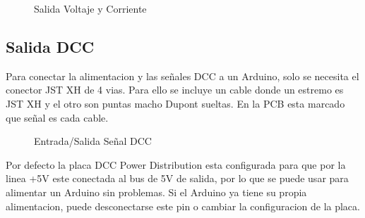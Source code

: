 \begin{figure}[h]
    \centering
    \caption{Salida Voltaje y Corriente}
    \label{fig:VccOutLeds}
\end{figure}

\subsection{Salida DCC}
Para conectar la alimentacion y las señales DCC a un Arduino, solo se necesita el conector JST XH de 4 vias. Para ello
se incluye un cable donde un estremo es JST XH y el otro son puntas macho Dupont sueltas. En la PCB esta marcado que señal
es cada cable.

\begin{figure}[H]
    \centering
    
    \caption{Entrada/Salida Señal DCC}
    \label{fig:DccOut}
\end{figure}
Por defecto la placa DCC Power Distribution esta configurada para que por la linea +5V
este conectada al bus de 5V de salida, por lo que se puede usar para alimentar un Arduino
sin problemas. Si el Arduino ya tiene su propia alimentacion, puede desconectarse este pin
o cambiar la configuracion de la placa. 

